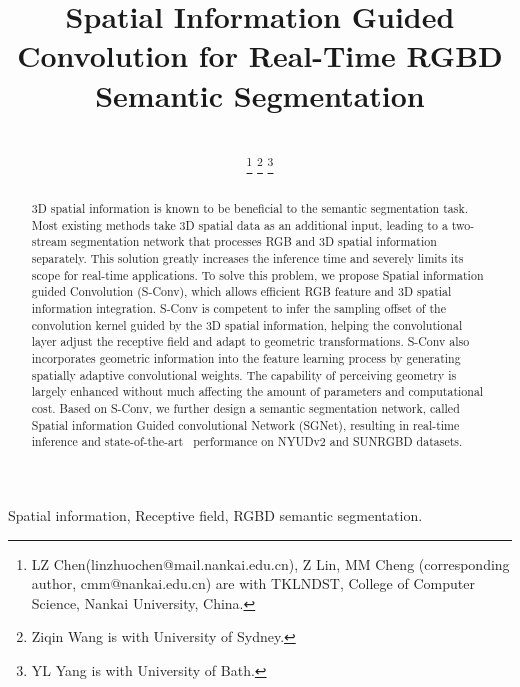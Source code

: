 \documentclass[journal]{IEEEtran}
\def\sArt{{state-of-the-art~}}
\begin{document}
\title{Spatial Information Guided Convolution for Real-Time RGBD Semantic Segmentation}


\author{\\
	\thanks{LZ Chen(linzhuochen@mail.nankai.edu.cn), Z Lin, MM Cheng (corresponding author, cmm@nankai.edu.cn)
	  are with TKLNDST, College of Computer Science, Nankai University, China.}
	\thanks{Ziqin Wang is with University of Sydney.}
	\thanks{YL Yang is with University of Bath.}
}







\maketitle

\begin{abstract}
3D spatial information is known to be beneficial to the semantic segmentation task.
Most existing methods take 3D spatial data as an additional input,
leading to a two-stream segmentation network that processes
RGB and 3D spatial information separately.
This solution greatly increases the inference time and 
severely limits its scope for real-time applications.
To solve this problem, we propose Spatial information guided 
Convolution (S-Conv), which allows efficient RGB feature and 
3D spatial information integration.
S-Conv is competent to infer the sampling offset of the convolution kernel 
guided by the 3D spatial information, helping the convolutional layer 
adjust the receptive field and adapt to geometric transformations.
S-Conv also incorporates geometric information 
into the feature learning process by generating spatially 
adaptive convolutional weights.
The capability of perceiving geometry is largely enhanced without much
affecting the amount of parameters and computational cost.
Based on S-Conv, we further design a semantic segmentation network,
called Spatial information Guided convolutional Network (SGNet),
resulting in real-time inference and \sArt
performance on NYUDv2 and SUNRGBD datasets. 
\end{abstract}

\begin{IEEEkeywords}
Spatial information, 
Receptive field, RGBD semantic segmentation.
\end{IEEEkeywords}
\end{document}
